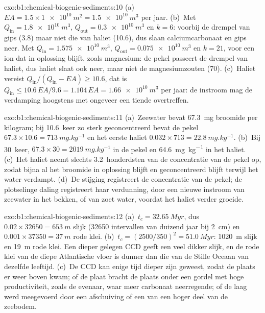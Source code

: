 \begin{solution}{exo:b1:chemical-biogenic-sediments:10}
(a)~$EA = 1.5\times\qty{1e10}{m^2} = \qty{1.5e10}{m^3}$ per jaar. (b)~Met
$Q_{\mathrm{in}} = \qty{1.8e10}{m^3}$, $Q_{\mathrm{out}} = \qty{0.3e10}{m^3}$ en
$k = 6$: voorbij de drempel van gips (3.8) maar niet die van haliet (10.6), dus
slaan calciumcarbonaat en gips neer. Met $Q_{\mathrm{in}} =
\qty{1.575e10}{m^3}$, $Q_{\mathrm{out}} = \qty{0.075e10}{m^3}$ en $k = 21$, voor
een ion dat in oplossing blijft, zoals magnesium: de pekel passeert de drempel van haliet,
dus haliet slaat ook neer, maar niet de magnesiumzouten (70).
(c)~Haliet vereist $Q_{\mathrm{in}}/(Q_{\mathrm{in}} - EA) \ge 10.6$, dat is
$Q_{\mathrm{in}} \le 10.6\,EA/9.6 = 1.104\,EA = \qty{1.66e10}{m^3}$ per jaar: de
instroom mag de verdamping hoogstens met ongeveer een tiende overtreffen.
\end{solution}

\begin{solution}{exo:b1:chemical-biogenic-sediments:11}
(a)~Zeewater bevat \qty{67.3}{mg} broomide per kilogram; bij 10.6~keer zo sterk
geconcentreerd bevat de pekel $67.3\times10.6 = \qty{713}{mg.kg^{-1}}$ en het eerste haliet
$0.032\times713 = \qty{22.8}{mg.kg^{-1}}$. (b)~Bij 30~keer, $67.3\times30 =
\qty{2019}{mg.kg^{-1}}$ in de pekel en \qty{64.6}{mg.kg^{-1}} in het haliet.
(c)~Het haliet neemt slechts 3.2~honderdsten van de concentratie van de pekel op, zodat
bijna al het broomide in oplossing blijft en geconcentreerd blijft terwijl het water
verdampt. (d)~De stijging registreert de concentratie van de pekel; de plotselinge daling
registreert haar verdunning, door een nieuwe instroom van zeewater in het bekken, of van zoet
water, voordat het haliet verder groeide.
\end{solution}

\begin{solution}{exo:b1:chemical-biogenic-sediments:12}
(a)~$t_c = \qty{32.65}{Myr}$, dus $0.02\times\num{32650} = \qty{653}{m}$ slijk
(\num{32650} intervallen van duizend jaar bij \qty{2}{cm}) en
$0.001\times\num{37350} = \qty{37}{m}$ rode klei. (b)~$t_c = (2500/350)^2 =
\qty{51.0}{Myr}$: \qty{1020}{m} slijk en \qty{19}{m} rode klei. Een dieper gelegen CCD
geeft een veel dikker slijk, en de rode klei van de diepe Atlantische vloer is dunner
dan die van de Stille Oceaan van dezelfde leeftijd. (c)~De CCD kan enige tijd dieper zijn geweest,
zodat de plaats er weer boven kwam; of de plaat bracht de plaats onder een gordel met hoge
productiviteit, zoals de evenaar, waar meer carbonaat neerregende; of de laag werd
meegevoerd door een afschuiving of een  van een hoger
deel van de zeebodem.
\end{solution}

